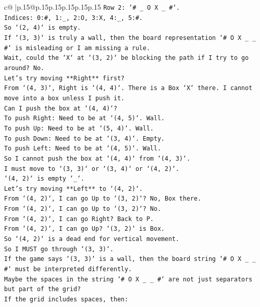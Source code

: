 \documentclass{article}
\begin{document}
{\begin{supertabular}{c@{$\;$}|p{.15\linewidth}@{}p{.15\linewidth}p{.15\linewidth}p{.15\linewidth}p{.15\linewidth}p{.15\linewidth}}
{{{\texttt{Row 2: `\# \_ O X \_ \#`.} \\
\texttt{Indices: 0:\#, 1:\_, 2:O, 3:X, 4:\_, 5:\#.} \\
\texttt{So `(2, 4)` is empty.} \\
\texttt{If `(3, 3)` is truly a wall, then the board representation `\# O X \_ \_ \#` is misleading or I am missing a rule.} \\
\texttt{Wait, could the `X` at `(3, 2)` be blocking the path if I try to go around? No.} \\
\texttt{Let's try moving **Right** first?} \\
\texttt{From `(4, 3)`, Right is `(4, 4)`. There is a Box `X` there. I cannot move into a box unless I push it.} \\
\texttt{Can I push the box at `(4, 4)`?} \\
\texttt{To push Right: Need to be at `(4, 5)`. Wall.} \\
\texttt{To push Up: Need to be at `(5, 4)`. Wall.} \\
\texttt{To push Down: Need to be at `(3, 4)`. Empty.} \\
\texttt{To push Left: Need to be at `(4, 5)`. Wall.} \\
\texttt{So I cannot push the box at `(4, 4)` from `(4, 3)`.} \\
\texttt{I must move to `(3, 3)` or `(3, 4)` or `(4, 2)`.} \\
\texttt{`(4, 2)` is empty `\_`.} \\
\texttt{Let's try moving **Left** to `(4, 2)`.} \\
\texttt{From `(4, 2)`, I can go Up to `(3, 2)`? No, Box there.} \\
\texttt{From `(4, 2)`, I can go Up to `(3, 2)`? No.} \\
\texttt{From `(4, 2)`, I can go Right? Back to P.} \\
\texttt{From `(4, 2)`, I can go Up? `(3, 2)` is Box.} \\
\texttt{So `(4, 2)` is a dead end for vertical movement.} \\
\texttt{So I MUST go through `(3, 3)`.} \\
\texttt{If the game says `(3, 3)` is a wall, then the board string `\# O X \_ \_ \#` must be interpreted differently.} \\
\texttt{Maybe the spaces in the string `\# O X \_ \_ \#` are not just separators but part of the grid?} \\
\texttt{If the grid includes spaces, then:} \\
}}}
\end{supertabular}}
\end{document}
